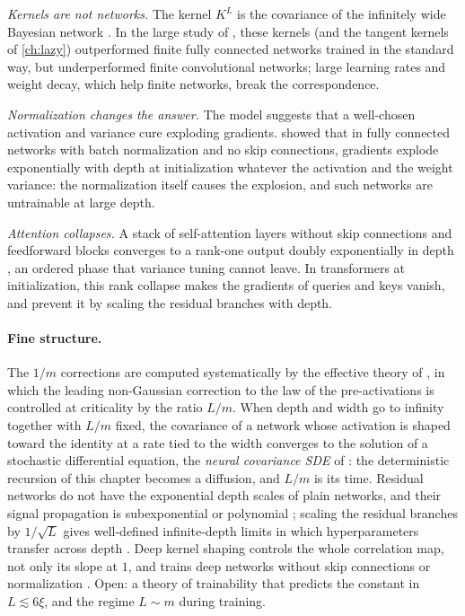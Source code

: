 \begin{refsection}
\emph{Kernels are not networks.} The kernel $K^L$ is the covariance of the infinitely wide Bayesian network \parencite{LeeEtAl2018}. In the large study of \textcite{LeeEtAl2020}, these kernels (and the tangent kernels of \cref{ch:lazy}) outperformed finite fully connected networks trained in the standard way, but underperformed finite convolutional networks; large learning rates and weight decay, which help finite networks, break the correspondence.

\emph{Normalization changes the answer.} The model suggests that a well-chosen activation and variance cure exploding gradients. \Textcite{YangEtAl2019} showed that in fully connected networks with batch normalization and no skip connections, gradients explode exponentially with depth at initialization whatever the activation and the weight variance: the normalization itself causes the explosion, and such networks are untrainable at large depth.

\emph{Attention collapses.} A stack of self-attention layers without skip connections and feedforward blocks converges to a rank-one output doubly exponentially in depth \parencite{DongEtAl2021}, an ordered phase that variance tuning cannot leave. In transformers at initialization, this rank collapse makes the gradients of queries and keys vanish, and \textcite{NociEtAl2022} prevent it by scaling the residual branches with depth.

\paragraph{Fine structure.} The $1/m$ corrections are computed systematically by the effective theory of \textcite{RobertsEtAl2022}, in which the leading non-Gaussian correction to the law of the pre-activations is controlled at criticality by the ratio $L/m$. When depth and width go to infinity together with $L/m$ fixed, the covariance of a network whose activation is shaped toward the identity at a rate tied to the width converges to the solution of a stochastic differential equation, the \emph{neural covariance SDE} of \textcite{LiEtAl2022}: the deterministic recursion of this chapter becomes a diffusion, and $L/m$ is its time. Residual networks do not have the exponential depth scales of plain networks, and their signal propagation is subexponential or polynomial \parencite{YangSchoenholz2017}; scaling the residual branches by $1/\sqrt L$ gives well-defined infinite-depth limits in which hyperparameters transfer across depth \parencite{YangEtAl2024,BordelonEtAl2024}. Deep kernel shaping controls the whole correlation map, not only its slope at $1$, and trains deep networks without skip connections or normalization \parencite{MartensEtAl2021}. Open: a theory of trainability that predicts the constant in $L\lesssim6\xi$, and the regime $L\sim m$ during training.


\end{refsection}

